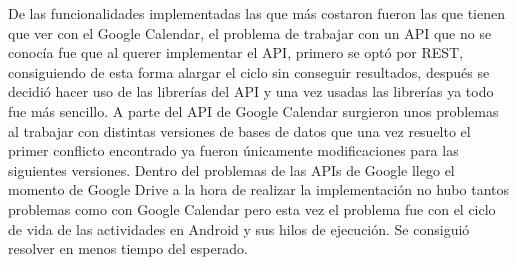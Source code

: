De las funcionalidades implementadas las que más costaron fueron las que tienen que ver con el Google Calendar, el problema de trabajar con un API que no se conocía fue que al querer implementar el API, primero se optó por REST, consiguiendo de esta forma alargar el ciclo sin conseguir resultados, después se decidió hacer uso de las librerías del API y una vez usadas las librerías ya todo fue más sencillo. A parte del API de Google Calendar surgieron unos problemas al trabajar con distintas versiones de bases de datos que una vez resuelto el primer conflicto encontrado ya fueron únicamente modificaciones para las siguientes versiones.
Dentro del problemas de las APIs de Google llego el momento de Google Drive a la hora de realizar la implementación no hubo tantos problemas como con Google Calendar pero esta vez el problema fue con el ciclo de vida de las actividades en Android y sus hilos de ejecución. Se consiguió resolver en menos tiempo del esperado.
